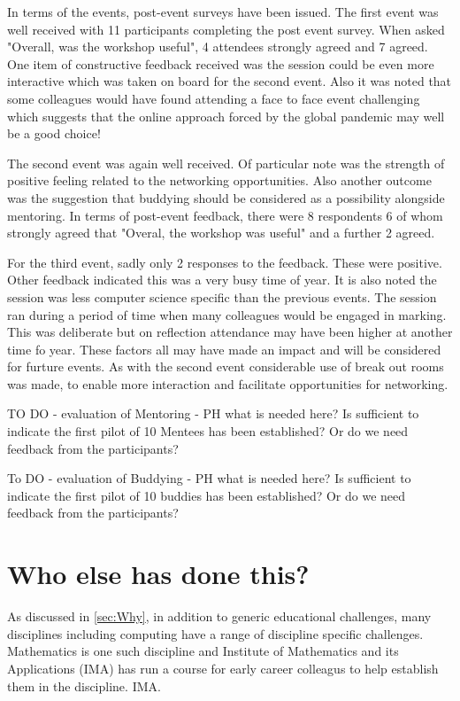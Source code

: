 \documentclass[sigconf]{acmart}
\begin{document}
In terms of the events, post-event surveys have been issued. The first event was well received with 11 participants completing the post event survey. When asked "Overall, was the workshop useful", 4 attendees strongly agreed and 7 agreed. One item of constructive feedback received was the session could be even more interactive which was taken on board for the second event. Also it was noted that some colleagues would have found attending a face to face event challenging which suggests that the online approach forced by the global pandemic may well be a good choice!

The second event was again well received. Of particular note was the strength of positive feeling related to the networking opportunities. Also another outcome was the suggestion that buddying should be considered as a possibility alongside mentoring. In terms of post-event feedback, there were 8 respondents 6 of whom strongly agreed that "Overal, the workshop was useful" and a further 2 agreed.

For the third event, sadly only 2 responses to the feedback. These were positive. Other feedback indicated this was a very busy time of year. It is also noted the session was less computer science specific than the previous events. The session ran during a period of time when many colleagues would be engaged in marking. This was deliberate but on reflection attendance may have been higher at another time fo year. These factors all may have made an impact and will be considered for furture events. As with the second event considerable use of break out rooms was made, to enable more interaction and facilitate opportunities for networking.

TO DO - evaluation of Mentoring - PH what is needed here? Is sufficient to indicate the first pilot of 10 Mentees has been established? Or do we need feedback from the participants?

To DO - evaluation of Buddying - PH what is needed here? Is sufficient to indicate the first pilot of 10 buddies has been established? Or do we need feedback from the participants?


\section{Who else has done this?}
As discussed in \ref{sec:Why}, in addition to generic educational challenges, many disciplines including computing have a range of discipline specific challenges. Mathematics is one such discipline and Institute of Mathematics and its Applications (IMA) has run a course for early career colleagus to help establish them in the discipline. {IMA}.
\end{document}
